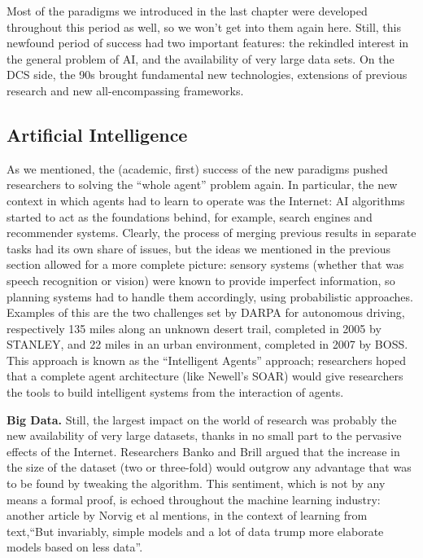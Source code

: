 \documentclass[../main.tex]{subfiles}
\begin{document}
Most of the paradigms we introduced in the last chapter were developed throughout this period as well, so we won't get into them again here. Still, this newfound period of success had two important features: the rekindled interest in the general problem of AI, and the availability of very large data sets. On the DCS side, the 90s brought fundamental new technologies, extensions of previous research and new all-encompassing frameworks.

\subsection{Artificial Intelligence}
As we mentioned, the (academic, first) success of the new paradigms pushed researchers to solving the ``whole agent'' problem again. In particular, the new context in which agents had to learn to operate was the Internet: AI algorithms started to act as the foundations behind, for example, search engines and recommender systems. Clearly, the process of merging previous results in separate tasks had its own share of issues, but the ideas we mentioned in the previous section allowed for a more complete picture: sensory systems (whether that was speech recognition or vision) were known to provide imperfect information, so planning systems had to handle them accordingly, using probabilistic approaches. Examples of this are the two challenges set by DARPA for autonomous driving, respectively 135 miles along an unknown desert trail, completed in 2005 by STANLEY, and 22 miles in an urban environment, completed in 2007 by BOSS. This approach is known as the ``Intelligent Agents'' approach; researchers hoped that a complete agent architecture (like Newell's SOAR\cite{pressSoarCognitiveArchitecture2012}) would give researchers the tools to build intelligent systems from the interaction of agents.

\vspace{4pt}
\textbf{Big Data.} 
Still, the largest impact on the world of research was probably the new availability of very large datasets, thanks in no small part to the pervasive effects of the Internet. Researchers Banko and Brill\cite{bankoScalingVeryVery2001} argued that the increase in the size of the dataset (two or three-fold) would outgrow any advantage that was to be found by tweaking the algorithm. This sentiment, which is not by any means a formal proof, is echoed throughout the machine learning industry: another article by Norvig et al mentions, in the context of learning from text,\enquote{But invariably, simple models and a lot of data trump more elaborate models based on less data}\cite{halevyUnreasonableEffectivenessData2009}.
\end{document}
